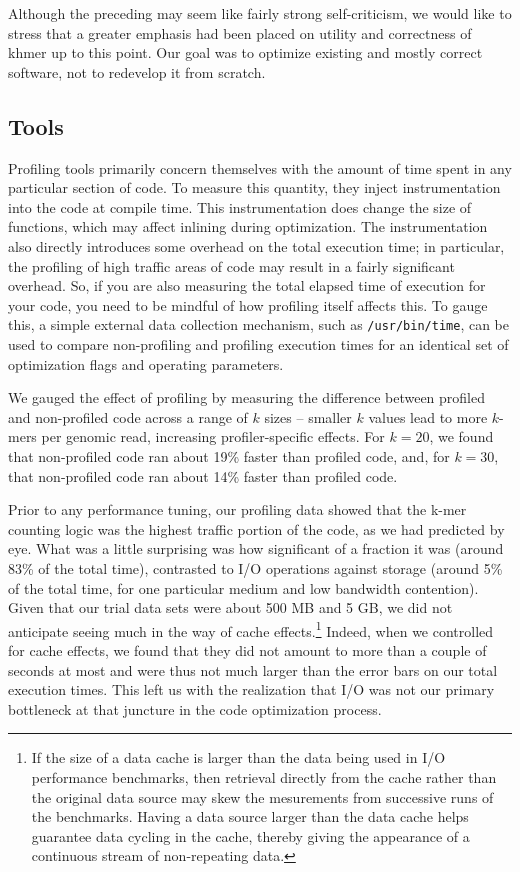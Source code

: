 \documentclass{article}
\begin{document}
Although the preceding may seem like fairly strong self-criticism, we
would like to stress that a greater emphasis had been placed on
utility and correctness of khmer up to this point.  Our goal was to optimize
existing and mostly correct software, not to redevelop it from scratch.

\subsection{Tools}

Profiling tools primarily concern themselves with the amount of time spent in
any particular section of code. To measure this quantity, they inject
instrumentation into the code at compile time. This instrumentation does change
the size of functions, which may affect inlining during optimization.  The
instrumentation also directly introduces some overhead on the total execution
time; in particular, the profiling of high traffic areas of code may result in
a fairly significant overhead. So, if you are also measuring the total elapsed
time of execution for your code, you need to be mindful of how profiling itself
affects this. To gauge this, a simple external data collection mechanism, such
as \texttt{/usr/bin/time}, can be used to compare non-profiling and profiling
execution times for an identical set of optimization flags and operating
parameters.  

We gauged the effect of profiling by measuring the difference between
profiled and non-profiled code across a range of $k$ sizes -- smaller
$k$ values lead to more $k$-mers per genomic read, increasing profiler-specific
effects.  For $k = 20$, we found that non-profiled code ran about 19\% faster
than profiled code, and, for $k = 30$, that non-profiled code ran about 14\%
faster than profiled code.

Prior to any performance tuning, our profiling data showed that the k-mer
counting logic was the highest traffic portion of the code, as we had predicted
by eye. What was a little surprising was how significant of a fraction it was
(around 83\% of the total time), contrasted to I/O operations against storage
(around 5\% of the total time, for one particular medium and low bandwidth
contention).  Given that our trial data sets were about 500 MB and 5 GB, we did
not anticipate seeing much in the way of cache effects.\footnote{If the size of
a data cache is larger than the data being used in I/O performance benchmarks,
then retrieval directly from the cache rather than the original data source may
skew the mesurements from successive runs of the benchmarks.  Having a data
source larger than the data cache helps guarantee data cycling in the cache,
thereby giving the appearance of a continuous stream of non-repeating data.}
Indeed, when we controlled for cache effects, we found that they did not amount
to more than a couple of seconds at most and were thus not much larger than the
error bars on our total execution times.  This left us with the realization
that I/O was not our primary bottleneck at that juncture in the code
optimization process.
\end{document}
